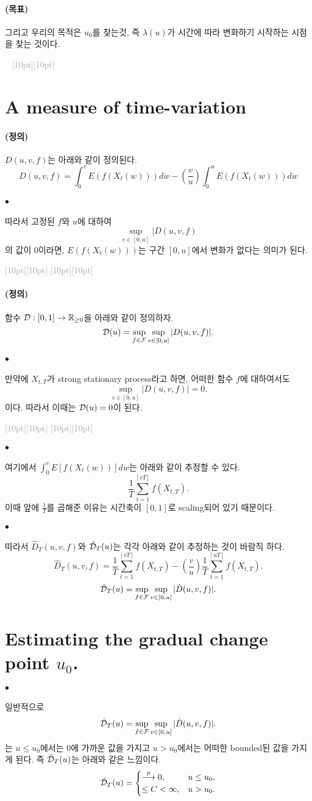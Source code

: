 \documentclass[12pt,oneside,english]{book}
\newcommand{\dash}{\vspace{2em}\noindent \textcolor{darkgray}{\hrulefill~ \raisebox{-2.5pt}[10pt][10pt]{\leafright \decofourleft \decothreeleft  \aldineright \decotwo \floweroneleft \decoone   \floweroneright \decotwo \aldineleft\decothreeright \decofourright \leafleft} ~  \hrulefill \\ \vspace{2em}}}
\newcommand{\rdash}{\noindent \textcolor{darkgray}{ \raisebox{-1.9pt}[10pt][10pt]{\leafright} \hrulefill \raisebox{-1.9pt}[10pt][10pt]{\leafright \decofourleft \decothreeleft  \aldineright \decotwo \floweroneleft \decoone}}}
\def\ck{\paragraph{\LARGE$\bullet$}\LARGE}
\def\goal{\paragraph{\LARGE(목표)}\LARGE}
\def\dfn{\paragraph{\LARGE(정의)}\LARGE}
\begin{document}
\goal 그리고 우리의 목적은 $u_0$를 찾는것, 즉 $\lambda(u)$가 시간에 따라 변화하기 시작하는 시점을 찾는 것이다. 


\dash

\section{A measure of time-variation}

\dfn 
$D(u,v,f)$는 아래와 같이 정의된다. 
\[
D(u,v,f)=\int_0^v E(f(X_t(w)))dw-\left(\frac{v}{u}\right) \int_0^u E(f(X_t(w)))dw
\]

\ck 
따라서 고정된 $f$와 $u$에 대하여 
\[
\sup_{v\in[0,u]}|D(u,v,f)
\]
의 값이 0이라면, $E(f(X_t(w)))$는 구간 $[0,u]$에서 변화가 없다는 의미가 된다. 

\rdash

\dfn 
함수 ${\cal D}:[0,1] \rightarrow \mathbb{R}_{\geq 0}$을 아래와 같이 정의하자. 	
$${\cal D}(u)=\sup_{f \in {\cal F}}\sup_{v \in [0,u]} |D(u,v,f)|.$$

\ck 만약에 $X_{t,T}$가 strong stationary process라고 하면, 어떠한 함수 $f$에 대하여서도 
\[
\sup_{v \in [0,u]}|D(u,v,f)|=0.
\]
이다. 따라서 이때는 ${\cal D}(u)=0$이 된다. 

\rdash 

\ck 여기에서 $\int_0^vE[f(X_t(w))]dw$는 아래와 같이 추정할 수 있다. 
$$\frac{1}{T}\sum_{t=1}^{[vT]}f(X_{t,T}).$$
이때 앞에 $\frac{1}{T}$를 곱해준 이유는 시간축이 $[0,1]$로 scaling되어 있기 때문이다. 

\ck 따라서 $\hat{D}_T(u,v,f)$와 $\hat{\cal D}_T(u)$는 각각 아래와 같이 추정하는 것이 바람직 하다. 
$$\hat{D}_T(u,v,f)=\frac{1}{T}\sum_{t=1}^{[vT]}f(X_{t,T})-\left(\frac{v}{u}\right) \frac{1}{T} \sum_{t=1}^{[uT]}f(X_{t,T}).$$
$$\hat{\cal D}_T(u)=\sup_{f \in {\cal F}}\sup_{v \in [0,u]} |\hat{D}(u,v,f)|.$$

\section{Estimating the gradual change point $u_0$.}

\ck 일반적으로 
$$\hat{\cal D}_T(u)=\sup_{f \in {\cal F}}\sup_{v \in [0,u]} |\hat{D}(u,v,f)|.$$
는 $u\leq u_0$에서는 0에 가까운 값을 가지고 $u>u_0$에서는 어떠한 bounded된 값을 가지게 된다. 즉 $\hat{\cal D}_T(u)$는 아래와 같은 느낌이다. 
$$\hat{\cal D}_T(u)=\begin{cases}
\overset{p}{\longrightarrow} 0 ,& u\leq u_0, \\ 
\leq C < \infty, & u>u_0.
\end{cases}$$
\end{document}
